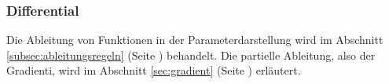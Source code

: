 \subsubsection{Differential}
Die Ableitung von Funktionen in der Parameterdarstellung wird im Abschnitt
\ref{subsec:ableitungsregeln} (Seite \pageref{subsec:ableitungsregeln})
behandelt. Die partielle Ableitung, also der Gradienti, wird im Abschnitt
\ref{sec:gradient} (Seite \pageref{sec:gradient}) erläutert.
